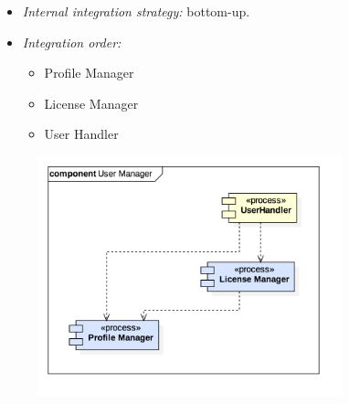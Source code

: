 			\begin{itemize}[label={},leftmargin=*,noitemsep,topsep=0pt]
				\item \textit{Internal integration strategy:} bottom-up.
				\item \textit{Integration order:}
					\begin{itemize}[noitemsep]
						\item Profile Manager
						\item License Manager
						\item User Handler
					\end{itemize}
			\end{itemize}
			\begin{figure}[h]
				\includegraphics[width=250pt, center]{img/integration_strategy/subcomponents/user_manager.png}
			\end{figure}
		\FloatBarrier


